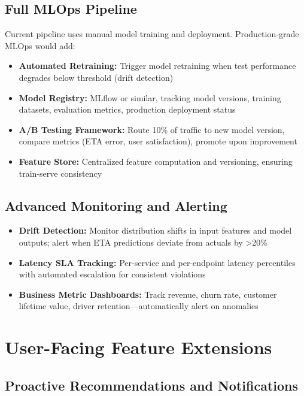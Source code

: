 \documentclass[12pt,a4paper]{report}
\begin{document}
\begin{itemize}
\subsection{Full MLOps Pipeline}

Current pipeline uses manual model training and deployment. Production-grade MLOps would add:

\begin{itemize}
    \item \textbf{Automated Retraining:} Trigger model retraining when test performance degrades below threshold (drift detection)
    \item \textbf{Model Registry:} MLflow or similar, tracking model versions, training datasets, evaluation metrics, production deployment status
    \item \textbf{A/B Testing Framework:} Route 10\% of traffic to new model version, compare metrics (ETA error, user satisfaction), promote upon improvement
    \item \textbf{Feature Store:} Centralized feature computation and versioning, ensuring train-serve consistency
\end{itemize}

\subsection{Advanced Monitoring and Alerting}

\begin{itemize}
    \item \textbf{Drift Detection:} Monitor distribution shifts in input features and model outputs; alert when ETA predictions deviate from actuals by >20\%
    \item \textbf{Latency SLA Tracking:} Per-service and per-endpoint latency percentiles with automated escalation for consistent violations
    \item \textbf{Business Metric Dashboards:} Track revenue, churn rate, customer lifetime value, driver retention—automatically alert on anomalies
\end{itemize}

\section{User-Facing Feature Extensions}

\subsection{Proactive Recommendations and Notifications}


\end{itemize}
\end{document}
